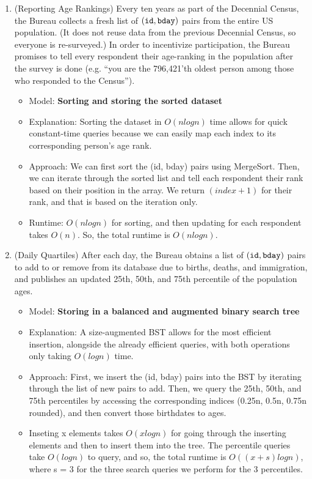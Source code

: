 \documentclass[11pt]{article}
\begin{document}
\begin{enumerate}
\begin{enumerate}
\item (Reporting Age Rankings)
Every ten years as part of the Decennial Census, the Bureau collects a fresh list of $(\texttt{id},\texttt{bday})$ pairs from the entire US population.
(It does not reuse data from the previous Decennial Census, so everyone is re-surveyed.)
In order to incentivize participation, the Bureau promises to tell every respondent their age-ranking in the population after the survey is done (e.g. ``you are the 796,421'th oldest person among those who responded to the Census'').
\\
\begin{itemize}
    \item Model: \textbf{Sorting and storing the sorted dataset}
    \item Explanation: Sorting the dataset in $O(nlogn)$ time allows for quick constant-time queries because we can easily map each index to its corresponding person's age rank.
    \item Approach: We can first sort the (id, bday) pairs using MergeSort. Then, we can iterate through the sorted list and tell each respondent their rank based on their position in the array. We return $(index + 1)$ for their rank, and that is based on the iteration only.
    \item Runtime: $O(nlogn)$ for sorting, and then updating for each respondent takes $O(n)$. So, the total runtime is $O(nlogn)$.\\
\end{itemize}
\item (Daily Quartiles)
After each day, the Bureau obtains a list of $(\texttt{id},\texttt{bday})$ pairs to add to or remove from its database due to births, deaths, and immigration, and publishes an updated 25th, 50th, and 75th percentile of the population ages.
\\
\begin{itemize}
    \item Model: \textbf{Storing in a balanced and augmented binary search tree}
    \item Explanation: A size-augmented BST allows for the most efficient insertion, alongside the already efficient queries, with both operations only taking $O(logn)$ time.
    \item Approach: First, we insert the (id, bday) pairs into the BST by iterating through the list of new pairs to add. Then, we query the 25th, 50th, and 75th percentiles by accessing the corresponding indices (0.25n, 0.5n, 0.75n rounded), and then convert those birthdates to ages.
    \item Inseting x elements takes $O(xlogn)$ for going through the inserting elements and then to insert them into the tree. The percentile queries take $O(logn)$ to query, and so, the total runtime is $O((x+s)logn)$, where s = 3 for the three search queries we perform for the 3 percentiles.\\
\end{itemize}


\end{enumerate}
\end{enumerate}
\end{document}
